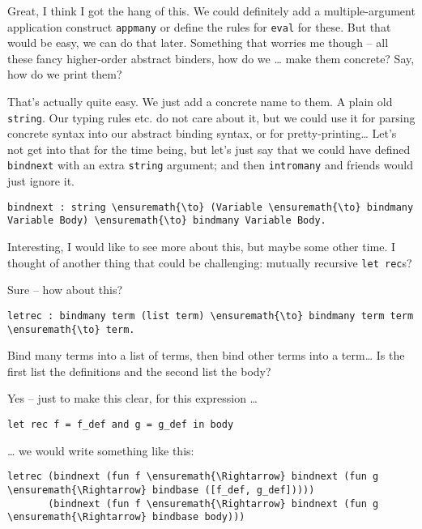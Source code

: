 \heroSTUDENT{} Great, I think I got the hang of this. We could definitely add
a multiple-argument application construct \texttt{appmany} or define the
rules for \texttt{eval} for these. But that would be easy, we can do
that later. Something that worries me though -- all these fancy
higher-order abstract binders, how do we \ldots{} make them concrete?
Say, how do we print them?

\heroADVISOR{} That's actually quite easy. We just add a concrete name to
them. A plain old \texttt{string}. Our typing rules etc. do not care
about it, but we could use it for parsing concrete syntax into our
abstract binding syntax, or for pretty-printing\ldots{} Let's not get
into that for the time being, but let's just say that we could have
defined \texttt{bindnext} with an extra \texttt{string} argument; and
then \texttt{intromany} and friends would just ignore it.

\begin{verbatim}
bindnext : string \ensuremath{\to} (Variable \ensuremath{\to} bindmany Variable Body) \ensuremath{\to} bindmany Variable Body.
\end{verbatim}

\heroSTUDENT{} Interesting, I would like to see more about this, but maybe
some other time. I thought of another thing that could be challenging:
mutually recursive \texttt{let\ rec}s?

\heroADVISOR{} Sure -- how about this?

\begin{verbatim}
letrec : bindmany term (list term) \ensuremath{\to} bindmany term term \ensuremath{\to} term.
\end{verbatim}

\heroSTUDENT{} Bind many terms into a list of terms, then bind other terms
into a term\ldots{} Is the first list the definitions and the second
list the body?

\heroADVISOR{} Yes -- just to make this clear, for this expression \ldots{}

\begin{verbatim}
let rec f = f_def and g = g_def in body
\end{verbatim}

\heroSTUDENT{} \ldots{} we would write something like this:

\begin{verbatim}
letrec (bindnext (fun f \ensuremath{\Rightarrow} bindnext (fun g \ensuremath{\Rightarrow} bindbase ([f_def, g_def]))))
       (bindnext (fun f \ensuremath{\Rightarrow} bindnext (fun g \ensuremath{\Rightarrow} bindbase body)))
\end{verbatim}


